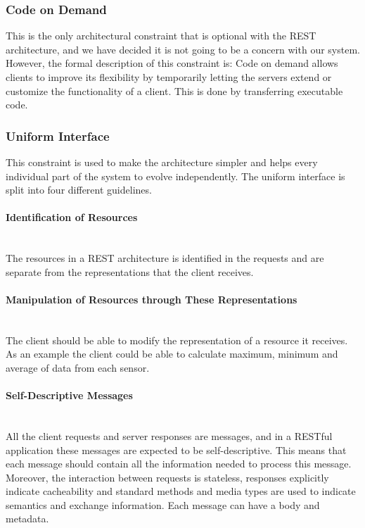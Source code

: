 \documentclass[../document.tex]{subfiles}
\begin{document}
\subsubsection{Code on Demand}
This is the only architectural constraint that is optional with the \gls{REST} architecture, and we have decided it is not going to be a concern with our system. However, the formal description of this constraint is: Code on demand allows clients to improve its flexibility by temporarily letting the servers extend or customize the functionality of a client. This is done by transferring executable code.

\subsubsection{Uniform Interface}
This constraint is used to make the architecture simpler and helps every individual part of the system to evolve independently. The uniform interface is split into four different guidelines.

\paragraph{Identification of Resources} \ \\
The resources in a \gls{REST} architecture is identified in the requests and are separate from the representations that the client receives. 

\paragraph{Manipulation of Resources through These Representations} \ \\
The client should be able to modify the representation of a resource it receives. As an example the client could be able to calculate maximum, minimum and average of data from each sensor. 

\paragraph{Self-Descriptive Messages} \ \\
All the client requests and server responses are messages, and in a RESTful application these messages are expected to be self-descriptive. This means that each message should contain all the information needed to process this message. Moreover, the interaction between requests is stateless, responses explicitly indicate cacheability and standard methods and media types are used to indicate semantics and exchange information. Each message can have a body and metadata.
\end{document}
